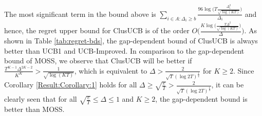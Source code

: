 
The most significant term in the bound above is $\sum_{i\in A:\Delta_{i}\geq b}\frac{96\log{\big(T\frac{\Delta_{i}^{2}}{\sqrt{\log (KT)}}\big)}}{\Delta_{i}}$ and hence, the regret upper bound for ClusUCB is of the order $O\bigg(\frac{K\log \big(\frac{T\Delta^{2}}{\sqrt{\log (KT)}}\big)}{\Delta}\bigg)$. As shown in Table \ref{tab:regret-bds}, the gap-dependent bound of ClusUCB is always better than UCB1 and UCB-Improved. 
%
In comparison to the gap-dependent bound of MOSS, we observe that ClusUCB will be better if 
$\frac{T^{K-1}\Delta^{2K-2}}{K^{K}} > \frac{1}{\sqrt{\log(KT)}}$, which is equivalent to $\Delta > \frac{2}{\sqrt{T}(\log 2T)^{\frac{1}{4}}}$ for
$K\geq 2$. Since Corollary \ref{Result:Corollary:1} holds for all $\Delta \geq \sqrt{\frac{e}{T}} > \frac{2}{\sqrt{T}(\log 2T)^{\frac{1}{4}}}$, it can be clearly seen that for all $\sqrt{\frac{e}{T}} \leq \Delta\leq 1$ and $K\geq 2$, the gap-dependent bound is better than MOSS.

